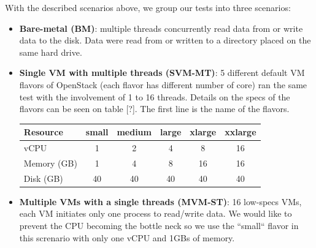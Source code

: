 \documentclass{acmsig}
\begin{document}
With the described scenarios above, we group our tests into three scenarios:
\begin{itemize}
  \item \textbf{Bare-metal (BM)}: multiple threads concurrently read data from or write data to the disk. Data were read from or written to a directory placed on the same hard drive.
      
  \item \textbf{Single VM with multiple threads (SVM-MT)}: 5 different default VM flavors of OpenStack (each flavor has different number of core) ran the same test with the involvement of 1 to 16 threads. Details on the specs of the flavors can be seen on table [?]. The first line is the name of the flavors.
      \begin{table}[h!]
      \begin{tabular}{|l|c|c|c|c|c|}
      \hline
      Resource & small & medium & large & xlarge & xxlarge \\
      \hline
      vCPU & 1 & 2 & 4 & 8 & 16 \\
      Memory (GB)& 1 & 4 & 8 & 16 & 16 \\
      Disk (GB)& 40 & 40 & 40 & 40 & 40 \\
      \hline
      \end{tabular}
      \end{table}
  \item \textbf{Multiple VMs with a single threads (MVM-ST)}: 16 low-specs VMs, each VM initiates only one process to read/write data. We would like to prevent the CPU becoming the bottle neck so we use the ``small`` flavor in this screnario with only one vCPU and 1GBs of memory.
\end{itemize}
\end{document}

